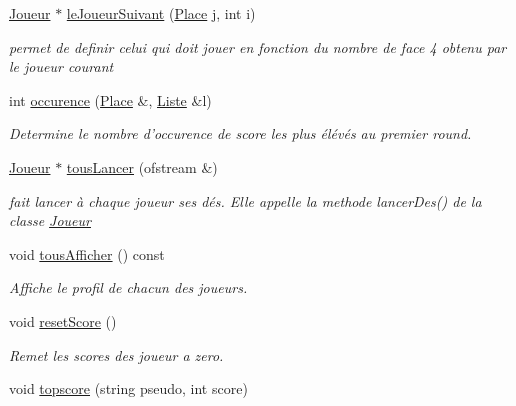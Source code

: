 \begin{DoxyCompactItemize}
\hyperlink{class_joueur}{\-Joueur} $\ast$ \hyperlink{class_liste_ad22d71eeea5628b092e7579df3ba9685}{le\-Joueur\-Suivant} (\hyperlink{class_cell}{\-Place} j, int i)
\begin{DoxyCompactList}\small\item\em permet de definir celui qui doit jouer en fonction du nombre de face 4 obtenu par le joueur courant \end{DoxyCompactList}\item 
int \hyperlink{class_liste_a577a0c06c4daf371d1170da07813346a}{occurence} (\hyperlink{class_cell}{\-Place} \&, \hyperlink{class_liste}{\-Liste} \&l)
\begin{DoxyCompactList}\small\item\em \-Determine le nombre d'occurence de score les plus élévés au premier round. \end{DoxyCompactList}\item 
\hyperlink{class_joueur}{\-Joueur} $\ast$ \hyperlink{class_liste_afbf29159bb1128888adc3f4295cf4108}{tous\-Lancer} (ofstream \&)
\begin{DoxyCompactList}\small\item\em fait lancer à chaque joueur ses dés. \-Elle appelle la methode lancer\-Des() de la classe \hyperlink{class_joueur}{\-Joueur} \end{DoxyCompactList}\item 
\hypertarget{class_liste_aabc3fff29d275aa61f8ea9716f70ec2d}{void \hyperlink{class_liste_aabc3fff29d275aa61f8ea9716f70ec2d}{tous\-Afficher} () const }\label{class_liste_aabc3fff29d275aa61f8ea9716f70ec2d}

\begin{DoxyCompactList}\small\item\em \-Affiche le profil de chacun des joueurs. \end{DoxyCompactList}\item 
\hypertarget{class_liste_a51699f909005a2fa17c42126a9a22732}{void \hyperlink{class_liste_a51699f909005a2fa17c42126a9a22732}{reset\-Score} ()}\label{class_liste_a51699f909005a2fa17c42126a9a22732}

\begin{DoxyCompactList}\small\item\em \-Remet les scores des joueur a zero. \end{DoxyCompactList}\item 
\hypertarget{class_liste_a12f9bfde6f9700a99c59bd02ed163710}{void \hyperlink{class_liste_a12f9bfde6f9700a99c59bd02ed163710}{topscore} (string pseudo, int score)}\label{class_liste_a12f9bfde6f9700a99c59bd02ed163710}


\end{DoxyCompactItemize}
